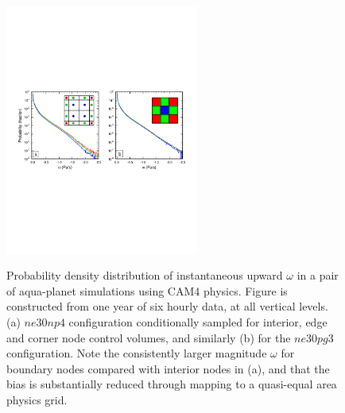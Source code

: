 \documentclass[twocol]{ametsoc}
\begin{document}
\begin{figure}[t]
\noindent\includegraphics[width=15pc,angle=0]{figs/temp_pdf_omg_np4_v_pg3_CROP.pdf}\\
\caption{Probability density distribution of instantaneous upward $\omega$ in a pair of aqua-planet simulations using CAM4 physics. Figure is constructed from one year of six hourly data, at all vertical levels. (a) $ne30np4$ configuration conditionally sampled for interior, edge and corner node control volumes, and similarly (b) for the $ne30pg3$ configuration. Note the consistently larger magnitude $\omega$ for boundary nodes compared with interior nodes in (a), and that the bias is substantially reduced through mapping to a quasi-equal area physics grid.}\label{fig:omega-se-volumes}
\end{figure}
\end{document}
